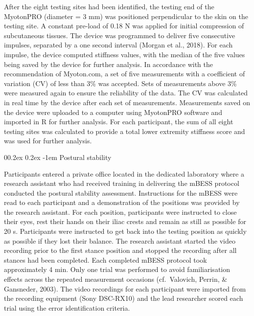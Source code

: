 \documentclass[
  english,
  man,floatsintext]{apa6}
\makeatletter
\renewcommand{\paragraph}{\@startsection{paragraph}{4}{\parindent}%
  {0\baselineskip \@plus 0.2ex \@minus 0.2ex}%
  {-1em}%
  {\normalfont\normalsize\bfseries\itshape\typesectitle}}
\makeatother
\begin{document}
After the eight testing sites had been identified, the testing end of the MyotonPRO (diameter = 3 mm) was positioned perpendicular to the skin on the testing site.
A constant pre-load of 0.18 N was applied for initial compression of subcutaneous tissues. The device was programmed to deliver five consecutive impulses, separated by a one second interval (Morgan et al., 2018).
For each impulse, the device computed stiffness values, with the median of the five values being saved by the device for further analysis.
In accordance with the recommendation of Myoton.com, a set of five measurements with a coefficient of variation (CV) of less than 3\% was accepted.
Sets of measurements above 3\% were measured again to ensure the reliability of the data.
The CV was calculated in real time by the device after each set of measurements.
Measurements saved on the device were uploaded to a computer using MyotonPRO software and imported in R for further analysis.
For each participant, the sum of all eight testing sites was calculated to provide a total lower extremity stiffness score and was used for further analysis.

\hypertarget{postural-stability-1}{%
\paragraph{Postural stability}\label{postural-stability-1}}

Participants entered a private office located in the dedicated laboratory where a research assistant who had received training in delivering the mBESS protocol conducted the postural stability assessment.
Instructions for the mBESS were read to each participant and a demonstration of the positions was provided by the research assistant.
For each position, participants were instructed to close their eyes, rest their hands on their iliac crests and remain as still as possible for 20 s.
Participants were instructed to get back into the testing position as quickly as possible if they lost their balance.
The research assistant started the video recording prior to the first stance position and stopped the recording after all stances had been completed.
Each completed mBESS protocol took approximately 4 min.
Only one trial was performed to avoid familiarisation effects across the repeated measurement occasions (cf.~Valovich, Perrin, \& Gansneder, 2003).
The video recordings for each participant were imported from the recording equipment (Sony DSC-RX10) and the lead researcher scored each trial using the error identification criteria.
\end{document}
